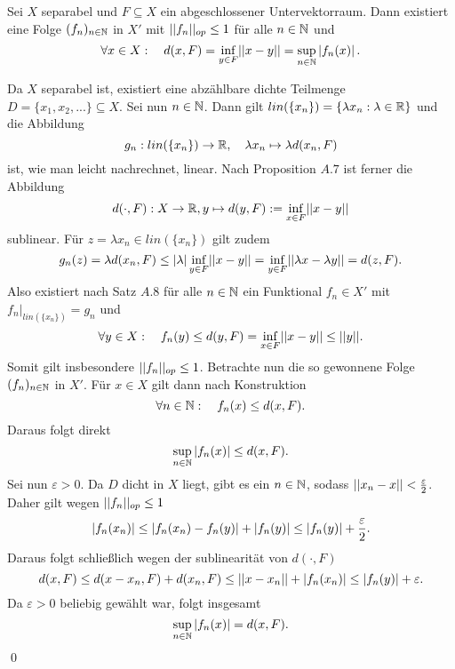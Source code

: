 \begin{corollary}
    Sei $X$ separabel und $F \subseteq X$ ein abgeschlossener Untervektorraum.
    Dann existiert eine Folge $(f_n)_{n \in \mathbb{N}}$ in $X'$ mit $\lvert\lvert f_n \rvert\rvert_{op} \leq 1$ für alle $n \in \mathbb{N}$ und 
    $$
        \forall x \in X: \quad d(x,F) = \inf_{y \in F}\lvert\lvert x-y \rvert\rvert = \sup_{n \in \mathbb{N}}\left| f_n(x) \right|. 
    $$
\end{corollary}
\begin{proof*}
    Da $X$ separabel ist, existiert eine abzählbare dichte Teilmenge $D = \{x_1,x_2,...\} \subseteq X$. Sei nun $n \in \mathbb{N}$. Dann gilt $lin(\{x_n\}) = \{\lambda x_n: \lambda \in \mathbb{R}\}$ und die Abbildung
    $$
        g_n: lin(\{x_n\}) \to \mathbb{R}, \quad \lambda x_n \mapsto \lambda d(x_n,F)
    $$
    ist, wie man leicht nachrechnet, linear. Nach Proposition $A.7$ ist ferner die Abbildung 
    $$
        d(\cdot, F):X \to \mathbb{R}, y \mapsto d(y,F) := \inf_{x \in F}\lvert\lvert x-y \rvert\rvert
    $$
    sublinear. Für $z = \lambda x_n \in lin(\{x_n\})$ gilt zudem 
    $$
        g_n(z) = \lambda d(x_n,F) \leq \left| \lambda \right| \inf_{y \in F}\lvert\lvert x-y \rvert\rvert = \inf_{y \in F}\lvert\lvert \lambda x - \lambda y \rvert\rvert = d(z,F). 
    $$
    Also existiert nach Satz $A.8$ für alle $n \in \mathbb{N}$ ein Funktional $f_n \in X'$ mit $f_n|_{lin(\{x_n\})} = g_n$ und 
    $$
        \forall y \in X: \quad f_n(y) \leq d(y,F) = \inf_{x \in F}\lvert\lvert x-y \rvert\rvert \leq \lvert\lvert y \rvert\rvert. 
    $$
    Somit gilt insbesondere $\lvert\lvert f_n \rvert\rvert_{op} \leq 1$. Betrachte nun die so gewonnene Folge $(f_n)_{n \in \mathbb{N}}$ in $X'$. Für $x \in X$ gilt dann nach Konstruktion
    $$
        \forall n \in \mathbb{N}: \quad f_n(x) \leq d(x,F). 
    $$
    Daraus folgt direkt
    $$
        \sup_{n \in \mathbb{N}}\left| f_n(x) \right| \leq d(x,F).
    $$
    Sei nun $\varepsilon > 0$. Da $D$ dicht in $X$ liegt, gibt es ein $n \in \mathbb{N}$, sodass $\lvert\lvert x_n - x \rvert\rvert < \frac{\varepsilon}{2}$. Daher gilt wegen $\lvert\lvert f_n \rvert\rvert_{op} \leq 1$
    $$
        \left| f_n(x_n) \right| \leq \left| f_n(x_n) - f_n(y) \right| + \left| f_n(y) \right| \leq \left| f_n(y) \right| + \frac{\varepsilon}{2}. 
    $$
    Daraus folgt schließlich wegen der sublinearität von $d(\cdot,F)$
    $$
        d(x,F) \leq d(x-x_n,F) + d(x_n,F) \leq \lvert\lvert x-x_n \rvert\rvert + \left| f_n(x_n) \right| \leq \left| f_n(y) \right| + \varepsilon. 
    $$
    Da $\varepsilon > 0$ beliebig gewählt war, folgt insgesamt
    $$
        \sup_{n \in \mathbb{N}}\left| f_n(x) \right| = d(x,F).
    $$
    \qed
\end{proof*}
